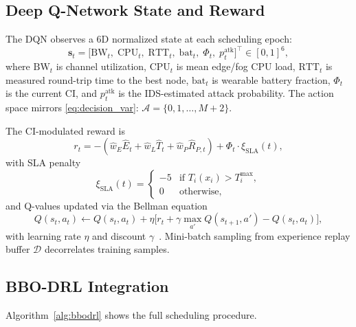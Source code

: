 \documentclass[journal]{IEEEtran}
\newcommand{\vect}[1]{\mathbf{#1}}
\newcommand{\set}[1]{\mathcal{#1}}
\begin{document}
\subsection{Deep Q-Network State and Reward}
\label{subsec:dqn}

The DQN observes a 6D normalized state at each scheduling epoch:
\begin{equation}
  \vect{s}_t = \bigl[\mathrm{BW}_t,\; \mathrm{CPU}_t,\; \mathrm{RTT}_t,\;
                      \mathrm{bat}_t,\; \Phi_t,\; p^{\mathrm{atk}}_t
               \bigr]^\top \in [0,1]^6,
  \label{eq:dqn_state}
\end{equation}
where $\mathrm{BW}_t$ is channel utilization, $\mathrm{CPU}_t$ is mean
edge/fog CPU load, $\mathrm{RTT}_t$ is measured round-trip time to the
best node, $\mathrm{bat}_t$ is wearable battery fraction, $\Phi_t$ is
the current CI, and $p^{\mathrm{atk}}_t$ is the IDS-estimated attack
probability. The action space mirrors \eqref{eq:decision_var}:
$\set{A} = \{0,1,\ldots,M+2\}$.

The CI-modulated reward is
\begin{equation}
  r_t = -(\hat{w}_E \hat{E}_t + \hat{w}_L \hat{T}_t + \hat{w}_P \hat{R}_{P,t})
         + \Phi_t \cdot \xi_{\mathrm{SLA}}(t),
  \label{eq:dqn_reward}
\end{equation}
with SLA penalty
\begin{equation}
  \xi_{\mathrm{SLA}}(t) =
  \begin{cases} -5 & \text{if } T_i(x_i) > T^{\max}_i, \\ 0 & \text{otherwise,} \end{cases}
  \label{eq:sla_penalty}
\end{equation}
and Q-values updated via the Bellman equation
\begin{equation}
  Q(s_t, a_t) \leftarrow Q(s_t, a_t)
    + \eta\bigl[r_t + \gamma \max_{a'} Q(s_{t+1},a') - Q(s_t,a_t)\bigr],
  \label{eq:bellman}
\end{equation}
with learning rate $\eta$ and discount $\gamma$~\cite{mnih2015}.
Mini-batch sampling from experience replay buffer $\set{D}$
decorrelates training samples.

\subsection{BBO-DRL Integration}
\label{subsec:hybrid}

Algorithm~\ref{alg:bbodrl} shows the full scheduling procedure.
\end{document}

